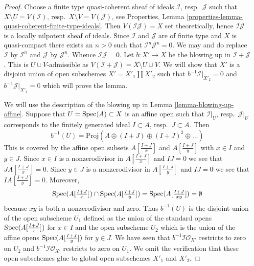 \begin{proof}
Choose a finite type quasi-coherent sheaf of ideals $\mathcal{I}$,
resp.\ $\mathcal{J}$ such that $X \setminus U = V(\mathcal{I})$,
resp.\ $X \setminus V = V(\mathcal{J})$, see
Properties, Lemma \ref{properties-lemma-quasi-coherent-finite-type-ideals}.
Then $V(\mathcal{I}\mathcal{J}) = X$ set theoretically, hence
$\mathcal{I}\mathcal{J}$ is a locally nilpotent sheaf of ideals.
Since $\mathcal{I}$ and $\mathcal{J}$ are of finite type and $X$
is quasi-compact there exists an $n > 0$ such that
$\mathcal{I}^n \mathcal{J}^n = 0$. We may and do replace $\mathcal{I}$
by $\mathcal{I}^n$ and $\mathcal{J}$ by $\mathcal{J}^n$. Whence
$\mathcal{I} \mathcal{J} = 0$. Let $b : X' \to X$ be the blowing
up in $\mathcal{I} + \mathcal{J}$. This is $U \cup V$-admissible
as $V(\mathcal{I} + \mathcal{J}) = X \setminus U \cup V$. We will show that
$X'$ is a disjoint union of open subschemes $X' = X'_1 \amalg X'_2$
such that $b^{-1}\mathcal{I}|_{X'_2} = 0$ and $b^{-1}\mathcal{J}|_{X'_1} = 0$
which will prove the lemma.

\medskip\noindent
We will use the description of the blowing up in
Lemma \ref{lemma-blowing-up-affine}. Suppose that $U = \mathop{\mathrm{Spec}}(A) \subset X$
is an affine open such that $\mathcal{I}|_U$, resp.\ $\mathcal{J}|_U$
corresponds to the finitely generated ideal $I \subset A$, resp.\ $J \subset A$.
Then
$$
b^{-1}(U) = \text{Proj}(A \oplus (I + J) \oplus (I + J)^2 \oplus \ldots)
$$
This is covered by the affine open subsets $A[\frac{I + J}{x}]$
and $A[\frac{I + J}{y}]$ with $x \in I$ and $y \in J$. Since $x \in I$ is a
nonzerodivisor in $A[\frac{I + J}{x}]$ and $IJ = 0$ we see that
$J A[\frac{I + J}{x}] = 0$. Since $y \in J$ is a nonzerodivisor
in $A[\frac{I + J}{y}]$ and $IJ = 0$ we see that
$I A[\frac{I + J}{y}] = 0$. Moreover,
$$
\mathop{\mathrm{Spec}}(A[\textstyle{\frac{I + J}{x}}]) \cap
\mathop{\mathrm{Spec}}(A[\textstyle{\frac{I + J}{y}}]) =
\mathop{\mathrm{Spec}}(A[\textstyle{\frac{I + J}{xy}}]) = \emptyset
$$
because $xy$ is both a nonzerodivisor and zero. Thus $b^{-1}(U)$
is the disjoint union of the open subscheme $U_1$ defined as the union
of the standard opens $\mathop{\mathrm{Spec}}(A[\frac{I + J}{x}])$ for $x \in I$ and the open
subscheme $U_2$ which is the union of the affine opens
$\mathop{\mathrm{Spec}}(A[\frac{I + J}{y}])$ for $y \in J$. We have seen that
$b^{-1}\mathcal{I}\mathcal{O}_{X'}$ restricts to zero on $U_2$
and $b^{-1}\mathcal{I}\mathcal{O}_{X'}$ restricts to zero on $U_1$.
We omit the verification that these open subschemes glue to global
open subschemes $X'_1$ and $X'_2$.
\end{proof}

